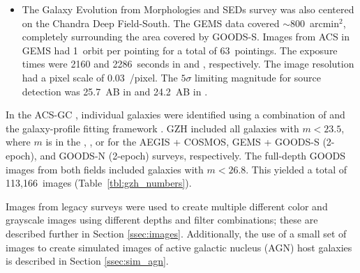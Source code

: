 \documentclass[twocolumn]{aastex6}
\begin{document}
\begin{itemize}
\item The Galaxy Evolution from Morphologies and SEDs
    \citep[GEMS;][]{rix04,cal08} survey was also centered on the Chandra Deep
    Field-South. The GEMS data covered $\sim800$~arcmin$^2$, completely surrounding
    the area covered by GOODS-S. Images from ACS in GEMS had 1~orbit per pointing
    for a total of 63~pointings. The exposure times were 2160 and 2286~seconds in
    \Vband{} and \zband{}, respectively. The image resolution had a pixel scale
    of 0.03~\arcsec/pixel. The $5\sigma$ limiting magnitude for source
    detection was 25.7~AB in \Vband{} and 24.2~AB in \zband. 

\end{itemize}

In the ACS-GC \citep{gri12}, individual galaxies were identified using a
combination of \sextractor{} \citep{ber96} and the galaxy-profile fitting
framework \galapagos{} \citep{bar12}. GZH included all galaxies with $m<23.5$,
where $m$ is in the \Iband, \zband, or \iband{} for the AEGIS + COSMOS, GEMS +
GOODS-S (2-epoch), and GOODS-N (2-epoch) surveys, respectively. The full-depth
GOODS images from both fields included galaxies with $m<26.8$. This yielded a
total of 113,166~images (Table~\ref{tbl:gzh_numbers}).

Images from \hst{} legacy surveys were used to create multiple different color
and grayscale images using different depths and filter combinations; these are
described further in Section \ref{ssec:images}. Additionally, the use of a
small set of \hst{} images to create simulated images of active galactic
nucleus (AGN) host galaxies is described in Section \ref{ssec:sim_agn}.


\end{document}
